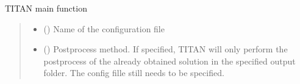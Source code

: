 \documentclass[letterpaper,10pt,english]{sphinxmanual}
\begin{document}
\begin{fulllineitems}
\label{\detokenize{modules:TITAN.main}}
\pysigstartsignatures
{}
\pysigstopsignatures
\sphinxAtStartPar
TITAN main function
\begin{quote}\begin{description}
\begin{itemize}
\item {} 
\sphinxAtStartPar
{} () \textendash{} Name of the configuration file

\item {} 
\sphinxAtStartPar
{} () \textendash{} Postprocess method. If specified, TITAN will only perform the postprocess of the already obtained solution in the specified output folder.
The config fille still needs to be specified.

\end{itemize}

\end{description}\end{quote}

\end{fulllineitems}

\end{document}
